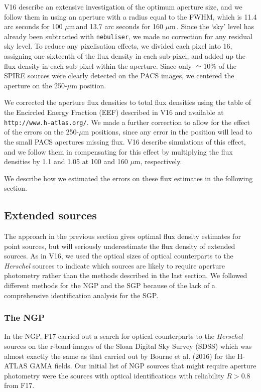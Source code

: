 \documentclass[useAMS,usenatbib]{mn2e}
\def\mic{ $\mu $m\,}
\begin{document}
V16 describe an extensive investigation of the optimum
aperture size, and we follow them in using an aperture
with a radius equal to the FWHM, which is
11.4 arc seconds for 100\mic and 13.7 arc seconds for
160\mic. Since the `sky' level has already been subtracted
with {\tt nebuliser}, we made no correction for any
residual sky level.
To reduce any pixelisation
effects, we divided each pixel into 16, assigning
one sixteenth of the flux density in each sub-pixel, and  
added up the flux density in each sub-pixel within the
aperture. 
Since only $\simeq$10\% of the
SPIRE sources were clearly detected on the PACS images,
we centered the aperture on the 250-$\mu$m position.

We corrected the aperture flux densities to
total flux densities using the 
table of the Encircled Energy Fraction (EEF)
described in V16 and available at {\tt
http://www.h-atlas.org/}.  
We made a further correction
to allow for the effect of the errors on the 250-$\mu$m positions,
since any error in the position will lead to the small PACS apertures
missing flux. V16 describe simulations of this effect, and we
follow them in compensating for this effect by multiplying the
flux densities by 1.1 and 1.05 at 100 and 160 $\mu$m, respectively.

We describe how we estimated the errors on these flux estimates in the
following section.

\subsection{Extended sources} 

The approach in the previous section
gives optimal flux density estimates for point sources, but will
seriously underestimate the flux density of extended sources. 
As in V16, we used the optical sizes of optical counterparts
to the {\it Herschel} sources to indicate which sources are
likely to require aperture photometry rather than the methods
described in the last section.
We followed different methods for the NGP and the SGP because
of the lack of a comprehensive identification analysis for the
SGP.

\subsubsection{The NGP}

In the NGP, F17 carried out a search for optical counterparts
to the {\it Herschel} sources on the r-band images
of the Sloan Digital Sky Survey (SDSS) which was almost exactly the
same as that carried out by Bourne et al. (2016) for the
H-ATLAS GAMA fields.
Our initial list of NGP sources that might require aperture
photometry were the sources with 
optical identifications
with reliability $R>0.8$ from F17.  
\end{document}
